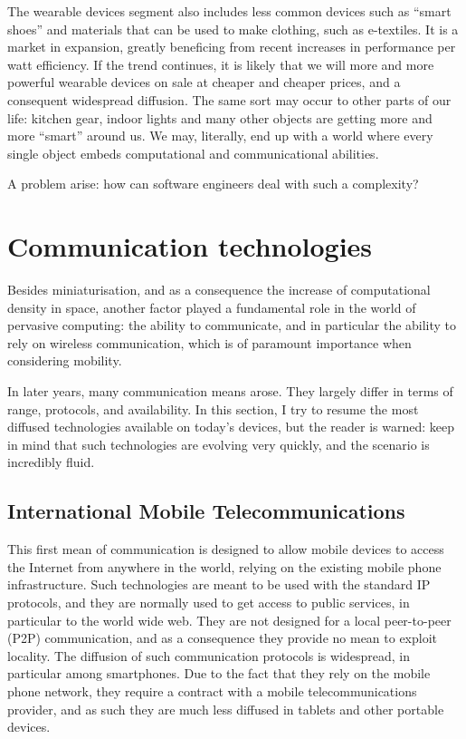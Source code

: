 \documentclass[12pt,a4paper,twoside,openright]{book}
\begin{document}
The wearable devices segment also includes less common devices such as ``smart shoes'' and materials that can be used to make clothing, such as e-textiles.
%
It is a market in expansion, greatly beneficing from recent increases in performance per watt efficiency.
%
If the trend continues, it is likely that we will more and more powerful wearable devices on sale at cheaper and cheaper prices, and a consequent widespread diffusion.
%
The same sort may occur to other parts of our life: kitchen gear, indoor lights and many other objects are getting more and more ``smart'' around us.
%
We may, literally, end up with a world where every single object embeds computational and communicational abilities.

A problem arise: how can software engineers deal with such a complexity?

\section{Communication technologies}

Besides miniaturisation, and as a consequence the increase of computational density in space, another factor played a fundamental role in the world of pervasive computing: the ability to communicate, and in particular the ability to rely on wireless communication, which is of paramount importance when considering mobility.

In later years, many communication means arose.
%
They largely differ in terms of range, protocols, and availability.
%
In this section, I try to resume the most diffused technologies available on today's devices, but the reader is warned: keep in mind that such technologies are evolving very quickly, and the scenario is incredibly fluid.

\subsection{International Mobile Telecommunications}
\label{International Mobile Telecommunications}

This first mean of communication is designed to allow mobile devices to access the Internet from anywhere in the world, relying on the existing mobile phone infrastructure.
%
Such technologies are meant to be used with the standard IP protocols, and they are normally used to get access to public services, in particular to the world wide web.
%
They are not designed for a local peer-to-peer (P2P) communication, and as a consequence they provide no mean to exploit locality.
%
The diffusion of such communication protocols is widespread, in particular among smartphones.
%
Due to the fact that they rely on the mobile phone network, they require a contract with a mobile telecommunications provider, and as such they are much less diffused in tablets and other portable devices.
\end{document}
